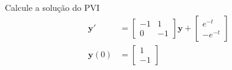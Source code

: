 \begin{exeresol}
  Calcule a solução do PVI
  \begin{align}
    \pmb{y}' &=
    \begin{bmatrix}
      -1 & 1 \\
      0 & -1
    \end{bmatrix}\pmb{y} +
    \begin{bmatrix}
      e^{-t} \\
      -e^{-t}
    \end{bmatrix} \\
    \pmb{y}(0) &=
    \begin{bmatrix}
      1 \\
      -1
    \end{bmatrix}
  \end{align}
\end{exeresol}
